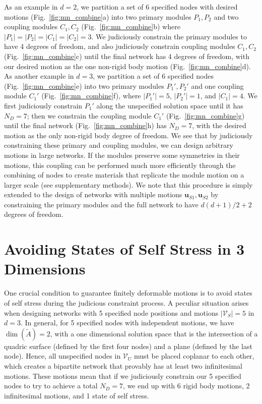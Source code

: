 \documentclass[%
preprint,
 amsmath,amssymb,
 aps,
]{revtex4-1}
\newcommand{\mc}{\mathcal}
\begin{document}
As an example in $d=2$, we partition a set of 6 specified nodes with desired motions (Fig.~\ref{fig:mn_combine}a) into two primary modules $P_1, P_2$ and two coupling modules $C_1, C_2$ (Fig.~\ref{fig:mn_combine}b) where $|P_1|=|P_2|=|C_1|=|C_2|=3$. We judiciously constrain the primary modules to have 4 degrees of freedom, and also judiciously constrain coupling modules $C_1, C_2$ (Fig.~\ref{fig:mn_combine}c) until the final network has 4 degrees of freedom, with our desired motion as the one non-rigid body motion (Fig.~\ref{fig:mn_combine}d). As another example in $d=3$, we partition a set of 6 specified nodes (Fig.~\ref{fig:mn_combine}e) into two primary modules $P_1', P_2'$ and one coupling module $C_1'$ (Fig.~\ref{fig:mn_combine}f), where $|P_1'| = 5$, $|P_2'| = 1$, and $|C_1| = 4$. We first judiciously constrain $P_1'$ along the unspecified solution space until it has $N_D = 7$; then we constrain the coupling module $C_1'$ (Fig.~\ref{fig:mn_combine}g) until the final network (Fig.~\ref{fig:mn_combine}h) has $N_D = 7$, with the desired motion as the only non-rigid body degree of freedom. We see that by judiciously constraining these primary and coupling modules, we can design arbitrary motions in large networks. If the modules preserve some symmetries in their motions, this coupling can be performed much more efficiently through the combining of nodes to create materials that replicate the module motion on a larger scale (see supplementary methods). We note that this procedure is simply extended to the design of networks with multiple motions $\bm{u}_{S1}, \bm{u}_{S2}$ by constraining the primary modules and the full network to have $d(d+1)/2 + 2$ degrees of freedom.







\section{Avoiding States of Self Stress in 3 Dimensions}
One crucial condition to guarantee finitely deformable motions is to avoid states of self stress during the judicious constraint process. A peculiar situation arises when designing networks with 5 specified node positions and motions $|\mc{V}_S| = 5$ in $d = 3$. In general, for 5 specified nodes with independent motions, we have $\dim(\tilde{A}) = 2$, with a one dimensional solution space that is the intersection of a quadric surface (defined by the first four nodes) and a plane (defined by the last node). Hence, all unspecified nodes in $\mc{V}_U$ must be placed coplanar to each other, which creates a bipartite network that provably has at least two infinitesimal motions. These motions mean that if we judiciously constrain our 5 specified nodes to try to achieve a total $N_D = 7$, we end up with 6 rigid body motions, 2 infinitesimal motions, and 1 state of self stress.
\end{document}
